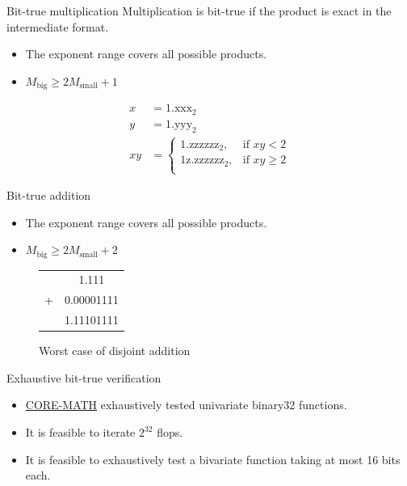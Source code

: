\documentclass{beamer}
\begin{document}
\begin{frame}{Bit-true multiplication}
	Multiplication is bit-true if the product is exact in the intermediate format.
	\begin{itemize}
		\item The exponent range covers all possible products.
		\item $M_{\text{big}} \ge 2M_{\text{small}} + 1$
	\end{itemize}

	\begin{example}
		\begin{align*}
			x  & = 1.\text{xxx}_2 \\
			y  & = 1.\text{yyy}_2 \\
			xy & =
			\begin{cases}
				1.\text{zzzzzz}_2,          & \text{if } xy < 2   \\
				1\text{z}.\text{zzzzzz}_2 , & \text{if } xy \ge 2 \\
			\end{cases}
		\end{align*}
	\end{example}
\end{frame}

\begin{frame}{Bit-true addition}
	\begin{itemize}
		\item The exponent range covers all possible products.
		\item $M_{\text{big}} \ge 2M_{\text{small}} + 2$
	\end{itemize}

	\begin{figure}
		\begin{tabular}{l S[table-format=2.8]}
			  & 1.111      \\
			+ & 0.00001111 \\
			\hline
			  & 1.11101111
		\end{tabular}
		\caption{Worst case of disjoint addition}
	\end{figure}
\end{frame}

\begin{frame}{Exhaustive bit-true verification}
	\begin{itemize}
		\item \href{https://core-math.gitlabpages.inria.fr/}{CORE-MATH} exhaustively tested univariate binary32 functions.
		\item It is feasible to iterate $2^{32}$ flops.
		\item It is feasible to exhaustively test a bivariate function taking at most 16 bits each.
	\end{itemize}
\end{frame}
\end{document}
